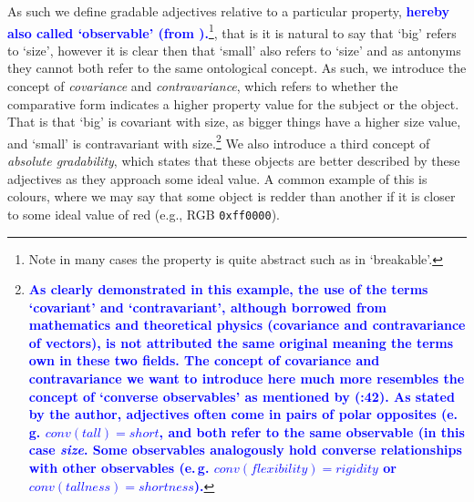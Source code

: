 \documentclass[11pt]{article}
\begin{document}
As such we define gradable adjectives relative to a particular 
property, \textbf{\textcolor{blue}{hereby also called `observable' (from \cite{Bennett06kr}).}}\footnote{Note in many cases the property is quite abstract such as in 
`breakable'.}, that is it is natural to say that `big' refers to 
`size', however it is clear then that `small' also refers to `size' and as antonyms 
they cannot both refer to the same ontological concept. As such, we introduce 
the concept of \emph{covariance} and \emph{contravariance}, which refers to 
whether the comparative form indicates a higher property value for the subject 
or the object. That is that `big' is covariant with size, as bigger things have 
a higher size value, and `small' is contravariant with size.\footnote{\textbf{\textcolor{blue}{As clearly demonstrated in this example, the use of the terms `covariant' and `contravariant', although borrowed from mathematics and theoretical physics (covariance and contravariance of vectors), is not attributed the same original meaning the terms own in these two fields. The concept of covariance and contravariance we want to introduce here much more resembles the concept of `converse observables' as mentioned by (\cite{Bennett06kr}:42). As stated by the author, adjectives often come in pairs of polar opposites (e.\,g. $conv(tall)=short$, and both refer to the same observable (in this case \textit{size}. Some observables analogously hold converse relationships with other observables (e.\,g. $conv(flexibility)=rigidity$ or $conv(tallness)=shortness$).}}} We also introduce 
a third concept of \emph{absolute gradability}, which states that these objects 
are better described by these adjectives as they approach some ideal value. 
A common example of this is colours, where we may say that some object is 
redder than another if it is closer to some ideal value of red 
(e.g., RGB {\tt 0xff0000}).
\end{document}
